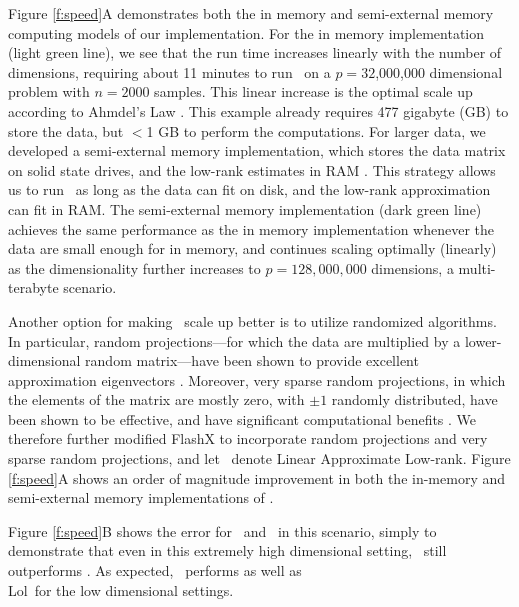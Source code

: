 \documentclass[10pt]{article}
\begin{document}
Figure \ref{f:speed}A demonstrates both the in memory and semi-external memory \cite{SEM_SpMM} computing models of our implementation.  For the in memory implementation (light green line), we see that the run time increases linearly with the number of dimensions, requiring about 11 minutes to run \Lol~on a $p=32$,$000$,$000$ dimensional problem with $n=2000$ samples.   This linear increase is the optimal scale up according to Ahmdel's Law \cite{Amdahl1967}.  This example already requires 477 gigabyte (GB) to store the data, but $<$1 GB to perform the computations.  For larger data, we developed a semi-external memory implementation, which stores the data matrix on solid state drives, and the low-rank estimates in RAM \cite{abello1998functional}.  This strategy allows us to run \Lol~as long as the data can fit on disk, and the low-rank approximation can fit in RAM.  The semi-external memory implementation (dark green line) achieves the same performance as the in memory implementation whenever the data are small enough for in memory, and continues scaling optimally (linearly) as the dimensionality further increases to $p=128,000,000$ dimensions, a multi-terabyte scenario.

Another option for making \Lol~scale up better is to utilize randomized algorithms.  In particular, random projections---for which the data are multiplied by a lower-dimensional random matrix---have been shown to provide excellent approximation eigenvectors \cite{Candes2006b}.  Moreover, very sparse random projections, in which the elements of the matrix are mostly zero, with $\pm 1$ randomly distributed, have been shown to be effective, and have significant computational benefits \cite{Hastie2006}. We therefore further modified FlashX to incorporate random projections and very sparse random projections, and let \Lal~denote Linear Approximate Low-rank.  Figure \ref{f:speed}A shows an order of magnitude improvement in both the in-memory and semi-external memory implementations of \Lal.


Figure \ref{f:speed}B shows the error for \Lol~and \PoF~in this scenario, simply to demonstrate that even in this extremely high dimensional setting, \Lol~still outperforms \PoF. As expected, \Lal~performs as well as \\Lol~for the low dimensional settings.

\end{document}

